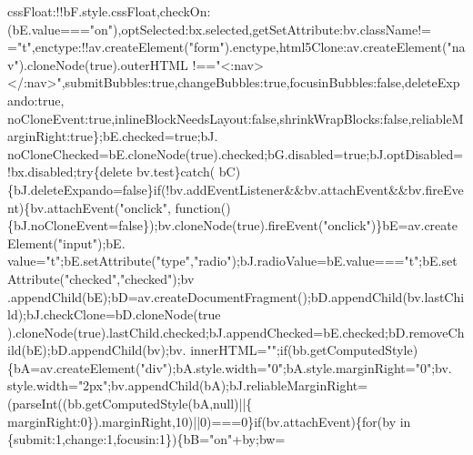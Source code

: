 \begin{DoxyCode}
      cssFloat:!!bF.style.cssFloat,checkOn:(bE.value===\textcolor{stringliteral}{"on"}),optSelected:bx.selected,getSetAttribute:bv.className!=
      =\textcolor{stringliteral}{"t"},enctype:!!av.createElement(\textcolor{stringliteral}{"form"}).enctype,html5Clone:av.createElement(\textcolor{stringliteral}{"nav"}).cloneNode(\textcolor{keyword}{true}).outerHTML
      !==\textcolor{stringliteral}{"<:nav></:nav>"},submitBubbles:\textcolor{keyword}{true},changeBubbles:\textcolor{keyword}{true},focusinBubbles:\textcolor{keyword}{false},deleteExpando:\textcolor{keyword}{true},
      noCloneEvent:\textcolor{keyword}{true},inlineBlockNeedsLayout:\textcolor{keyword}{false},shrinkWrapBlocks:\textcolor{keyword}{false},reliableMarginRight:\textcolor{keyword}{true}\};bE.checked=\textcolor{keyword}{true};bJ.
      noCloneChecked=bE.cloneNode(\textcolor{keyword}{true}).checked;bG.disabled=\textcolor{keyword}{true};bJ.optDisabled=!bx.disabled;\textcolor{keywordflow}{try}\{\textcolor{keyword}{delete} bv.test\}\textcolor{keywordflow}{catch}(
      bC)\{bJ.deleteExpando=\textcolor{keyword}{false}\}\textcolor{keywordflow}{if}(!bv.addEventListener&&bv.attachEvent&&bv.fireEvent)\{bv.attachEvent(\textcolor{stringliteral}{"onclick"},\textcolor{keyword}{
      function}()\{bJ.noCloneEvent=\textcolor{keyword}{false}\});bv.cloneNode(\textcolor{keyword}{true}).fireEvent(\textcolor{stringliteral}{"onclick"})\}bE=av.createElement(\textcolor{stringliteral}{"input"});bE.
      value=\textcolor{stringliteral}{"t"};bE.setAttribute(\textcolor{stringliteral}{"type"},\textcolor{stringliteral}{"radio"});bJ.radioValue=bE.value===\textcolor{stringliteral}{"t"};bE.setAttribute(\textcolor{stringliteral}{"checked"},\textcolor{stringliteral}{"checked"});bv
      .appendChild(bE);bD=av.createDocumentFragment();bD.appendChild(bv.lastChild);bJ.checkClone=bD.cloneNode(\textcolor{keyword}{true}
      ).cloneNode(\textcolor{keyword}{true}).lastChild.checked;bJ.appendChecked=bE.checked;bD.removeChild(bE);bD.appendChild(bv);bv.
      innerHTML=\textcolor{stringliteral}{""};\textcolor{keywordflow}{if}(bb.getComputedStyle)\{bA=av.createElement(\textcolor{stringliteral}{"div"});bA.style.width=\textcolor{stringliteral}{"0"};bA.style.marginRight=\textcolor{stringliteral}{"0"};bv.
      style.width=\textcolor{stringliteral}{"2px"};bv.appendChild(bA);bJ.reliableMarginRight=(parseInt((bb.getComputedStyle(bA,null)||\{
      marginRight:0\}).marginRight,10)||0)===0\}\textcolor{keywordflow}{if}(bv.attachEvent)\{\textcolor{keywordflow}{for}(by in \{submit:1,change:1,focusin:1\})\{bB=\textcolor{stringliteral}{"on"}+by;bw=

\end{DoxyCode}
